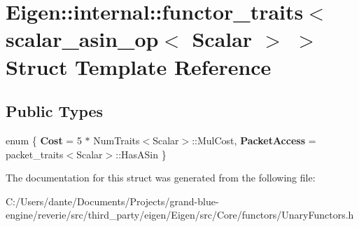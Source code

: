 \hypertarget{struct_eigen_1_1internal_1_1functor__traits_3_01scalar__asin__op_3_01_scalar_01_4_01_4}{}\section{Eigen\+::internal\+::functor\+\_\+traits$<$ scalar\+\_\+asin\+\_\+op$<$ Scalar $>$ $>$ Struct Template Reference}
\label{struct_eigen_1_1internal_1_1functor__traits_3_01scalar__asin__op_3_01_scalar_01_4_01_4}
\subsection*{Public Types}
\begin{DoxyCompactItemize}
\item 
\mbox{\label{struct_eigen_1_1internal_1_1functor__traits_3_01scalar__asin__op_3_01_scalar_01_4_01_4_ac551ecc7623c2b032e1919133755b3cd}} 
enum \{ {\bfseries Cost} = 5 $\ast$ Num\+Traits$<$Scalar$>$\+::Mul\+Cost, 
{\bfseries Packet\+Access} = packet\+\_\+traits$<$Scalar$>$\+::Has\+A\+Sin
 \}
\end{DoxyCompactItemize}


The documentation for this struct was generated from the following file\+:\begin{DoxyCompactItemize}
\item 
C\+:/\+Users/dante/\+Documents/\+Projects/grand-\/blue-\/engine/reverie/src/third\+\_\+party/eigen/\+Eigen/src/\+Core/functors/Unary\+Functors.\+h\end{DoxyCompactItemize}
